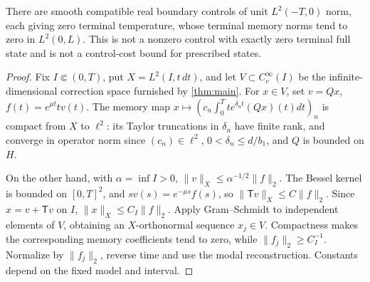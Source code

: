 \begin{corollary}
There are smooth compatible real boundary controls of unit \(L^2(-T,0)\) norm, each giving zero terminal temperature, whose terminal memory norms tend to zero in \(L^2(0,L)\). This is not a nonzero control with exactly zero terminal full state and is not a control-cost bound for prescribed states.
\end{corollary}
\begin{proof}
Fix \(I\Subset(0,T)\), put \(X=L^2(I,t\,dt)\), and let \(V\subset C_c^\infty(I)\) be the infinite-dimensional correction space furnished by \cref{thm:main}. For \(x\in V\), set \(v=Qx\), \(f(t)=e^{\mu t}tv(t)\). The memory map \(x\mapsto(c_n\int_0^T te^{\delta_nt}(Qx)(t)dt)_n\) is compact from \(X\) to \(\ell^2\): its Taylor truncations in \(\delta_n\) have finite rank, and converge in operator norm since \((c_n)\in\ell^2\), \(0<\delta_n\le d/b_1\), and \(Q\) is bounded on \(H\).

On the other hand, with \(\alpha=\inf I>0\), \(\|v\|_{X}\le\alpha^{-1/2}\|f\|_2\). The Bessel kernel is bounded on \([0,T]^2\), and \(sv(s)=e^{-\mu s}f(s)\), so \(\|\mathsf Tv\|_X\le C\|f\|_2\). Since \(x=v+\mathsf Tv\) on \(I\), \(\|x\|_X\le C_I\|f\|_2\). Apply Gram--Schmidt to independent elements of \(V\), obtaining an \(X\)-orthonormal sequence \(x_j\in V\). Compactness makes the corresponding memory coefficients tend to zero, while \(\|f_j\|_2\ge C_I^{-1}\). Normalize by \(\|f_j\|_2\), reverse time and use the modal reconstruction. Constants depend on the fixed model and interval.
\end{proof}
